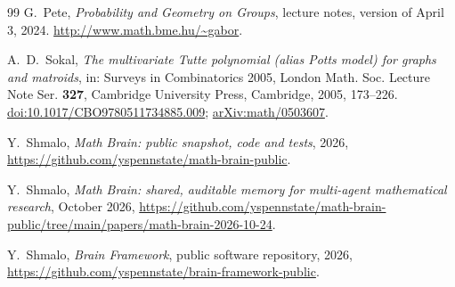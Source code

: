 \documentclass[11pt]{amsart}
\theoremstyle{remark}
\numberwithin{equation}{section}
\begin{document}
\begin{thebibliography}{99}
G.~Pete,
\emph{Probability and Geometry on Groups},
lecture notes, version of April 3, 2024.
\url{http://www.math.bme.hu/~gabor}.

A.~D.~Sokal,
\emph{The multivariate Tutte polynomial (alias Potts model) for graphs and matroids},
in: Surveys in Combinatorics 2005, London Math. Soc. Lecture Note Ser. \textbf{327}, Cambridge University Press, Cambridge, 2005, 173--226.
\href{https://doi.org/10.1017/CBO9780511734885.009}{doi:10.1017/CBO9780511734885.009};
\href{https://arxiv.org/abs/math/0503607}{arXiv:math/0503607}.

 Y.~Shmalo, \emph{Math Brain: public snapshot, code and tests}, 2026, \url{https://github.com/yspennstate/math-brain-public}.

 Y.~Shmalo, \emph{Math Brain: shared, auditable memory for multi-agent mathematical research}, October 2026, \url{https://github.com/yspennstate/math-brain-public/tree/main/papers/math-brain-2026-10-24}.

 Y.~Shmalo, \emph{Brain Framework}, public software repository, 2026, \url{https://github.com/yspennstate/brain-framework-public}.

\end{thebibliography}
\end{document}
